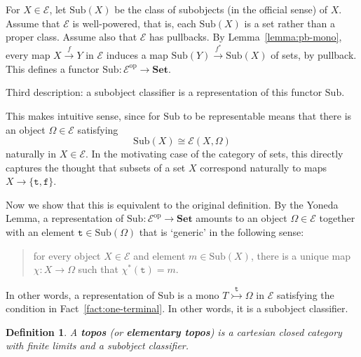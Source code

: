 \documentclass{article}
\newcommand{\cat}[1]{\mathscr{#1}}
\newcommand{\fcat}[1]{\mathbf{#1}}
\newcommand{\op}{\mathrm{op}}
\newcommand{\Set}{\fcat{Set}}
\newcommand{\demph}[1]{\textbf{\textup{#1}}}
\newcommand{\iso}{\cong}
\newcommand{\tr}{\texttt{t}}
\newcommand{\fa}{\texttt{f}}
\newcommand{\E}{\cat{E}}
\newcommand{\Sub}{\mathrm{Sub}}
\newcommand{\toby}[1]{\stackrel{#1}{\to}}
\newcommand{\monic}{\rightarrowtail}
\newcommand{\monicby}[1]{\stackrel{#1}{\monic}}
\newcommand{\cln}{\colon}
\newtheorem{predefn}[thm]{Definition}
\newenvironment{defn}{\begin{predefn}\upshape}{\end{predefn}}
\begin{document}
For $X \in \E$, let $\Sub(X)$ be the class of subobjects (in the official
sense) of $X$.  Assume that $\E$ is well-powered, that is, each $\Sub(X)$ is a
set rather than a proper class.  Assume also that $\E$ has pullbacks.  By
Lemma~\ref{lemma:pb-mono}, every map $X \toby{f} Y$ in $\E$ induces a map
$\Sub(Y) \toby{f^*} \Sub(X)$ of sets, by pullback.  This defines a functor
$\Sub\cln \E^\op \to \Set$.

Third description: a subobject classifier is a representation of this functor
$\Sub$.

This makes intuitive sense, since for $\Sub$ to be representable means that
there is an object $\Omega \in \E$ satisfying
\[
\Sub(X) \iso \E(X, \Omega)
\]
naturally in $X \in \E$.  In the motivating case of the category of sets, this
directly captures the thought that subsets of a set $X$ correspond naturally
to maps $X \to \{\tr, \fa\}$.  

Now we show that this is equivalent to the original definition.  By the Yoneda
Lemma, a representation of $\Sub\cln \E^\op \to \Set$ amounts to an object
$\Omega \in \E$ together with an element $\tr \in \Sub(\Omega)$ that is
`generic' in the following sense:
% 
\begin{quote}
for every object $X \in \E$ and element $m \in \Sub(X)$, there is a unique map
$\chi\cln X \to \Omega$ such that $\chi^*(\tr) = m$.
\end{quote}
% 
In other words, a representation of $\Sub$ is a mono $T \monicby{\tr} \Omega$
in $\E$ satisfying the condition in Fact~\ref{fact:one-terminal}.  In other
words, it is a subobject classifier.

\begin{defn}
A \demph{topos} (or \demph{elementary topos}) is a cartesian closed category
with finite limits and a subobject classifier.
\end{defn}
\end{document}
